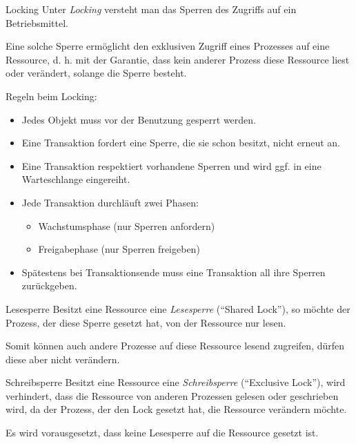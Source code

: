 \begin{defi}{Locking}
    Unter \emph{Locking} versteht man das Sperren des Zugriffs auf ein Betriebsmittel.

    Eine solche Sperre ermöglicht den exklusiven Zugriff eines Prozesses auf eine Ressource, d. h. mit der Garantie, dass kein anderer Prozess diese Ressource liest oder verändert, solange die Sperre besteht.

    Regeln beim Locking:
    \begin{itemize}
        \item Jedes Objekt muss vor der Benutzung gesperrt werden.
        \item Eine Transaktion fordert eine Sperre, die sie schon besitzt, nicht erneut an.
        \item Eine Transaktion respektiert vorhandene Sperren und wird ggf. in eine Warteschlange eingereiht.
        \item Jede Transaktion durchläuft zwei Phasen:
              \begin{itemize}
                  \item Wachstumsphase (nur Sperren anfordern)
                  \item Freigabephase (nur Sperren freigeben)
              \end{itemize}
        \item Spätestens bei Transaktionsende muss eine Transaktion all ihre Sperren zurückgeben.
    \end{itemize}
\end{defi}

\begin{bonus}{Lesesperre}
    Besitzt eine Ressource eine \emph{Lesesperre} (\enquote{Shared Lock}), so möchte der Prozess, der diese Sperre gesetzt hat, von der Ressource nur lesen.

    Somit können auch andere Prozesse auf diese Ressource lesend zugreifen, dürfen diese aber nicht verändern.
\end{bonus}

\begin{bonus}{Schreibsperre}
    Besitzt eine Ressource eine \emph{Schreibsperre} (\enquote{Exclusive Lock}), wird verhindert, dass die Ressource von anderen Prozessen gelesen oder geschrieben wird, da der Prozess, der den Lock gesetzt hat, die Ressource verändern möchte.

    Es wird vorausgesetzt, dass keine Lesesperre auf die Ressource gesetzt ist.
\end{bonus}

